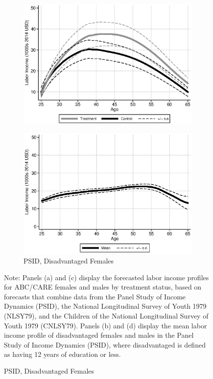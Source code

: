 \begin{figure}
\begin{subfigure}[h]{0.4\textwidth}
		\includegraphics[width=\textwidth]{output/labor_25-60_female_1.eps}
\end{subfigure}%
\begin{subfigure}[h]{0.4\textwidth}
	\centering
	\caption{PSID, Disadvantaged Females} \label{fig:psid0}
		\includegraphics[width=\textwidth]{output/psid_incomeprofiles_s0.eps}
\end{subfigure}
\footnotesize \justify
Note: Panels (a) and (c) display the forecasted labor income profiles for ABC/CARE females and males by treatment status, based on forecasts that combine data from the Panel Study of Income Dynamics (PSID), the National Longitudinal Survey of Youth 1979 (NLSY79), and the Children of the National Longitudinal Survey of Youth 1979 (CNLSY79). Panels (b) and (d) display the mean labor income profile of disadvantaged females and males in the Panel Study of Income Dynamics (PSID), where disadvantaged is defined as having 12 years of education or less.\\
\end{figure}

